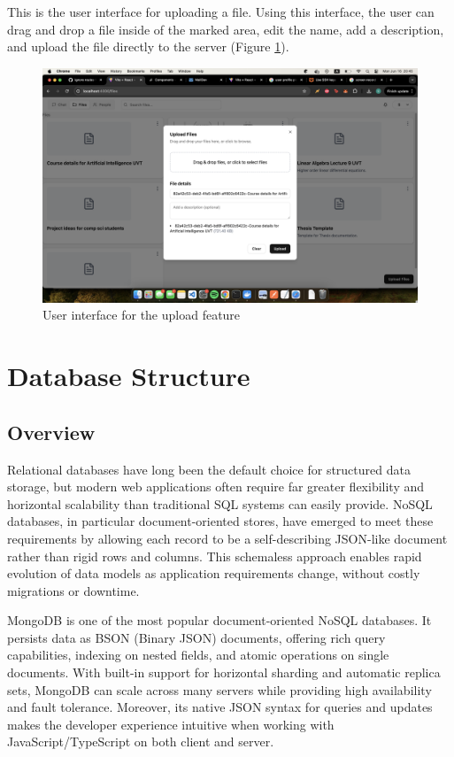 This is the user interface for uploading a file. Using this interface, the user can drag and drop a file inside of the marked area, edit the name, add a description, and upload the file directly to the server (Figure \ref{fig:upload-feature}).

\begin{figure}[H]
    \centering
    \includegraphics[width=1\linewidth]{screenshots/upload-feature.png}
    \caption{User interface for the upload feature}
    \label{fig:upload-feature}
\end{figure}

\section{Database Structure}

\subsection{Overview}

Relational databases have long been the default choice for structured data storage, but modern web applications often require far greater flexibility and horizontal scalability than traditional SQL systems can easily provide.  NoSQL databases, in particular document-oriented stores, have emerged to meet these requirements by allowing each record to be a self-describing JSON-like document rather than rigid rows and columns.  This schemaless approach enables rapid evolution of data models as application requirements change, without costly migrations or downtime.

MongoDB\cite{MONGODB} is one of the most popular document-oriented NoSQL databases.  It persists data as BSON (Binary JSON) documents, offering rich query capabilities, indexing on nested fields, and atomic operations on single documents.  With built-in support for horizontal sharding and automatic replica sets, MongoDB can scale across many servers while providing high availability and fault tolerance.  Moreover, its native JSON syntax for queries and updates makes the developer experience intuitive when working with JavaScript/TypeScript on both client and server.

